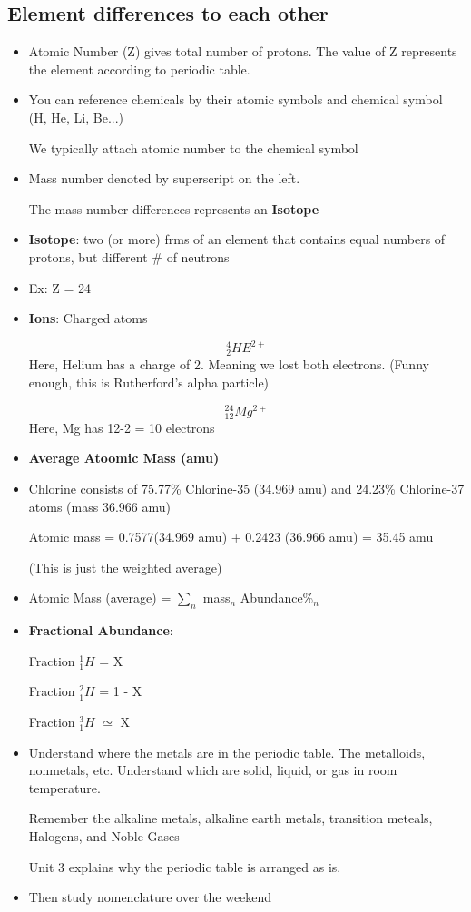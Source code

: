 \documentclass{article}
\begin{document}
\subsection{Element differences to each other}
\begin{itemize}
  \item Atomic Number (Z) gives total number of protons. The value of Z represents the element according to periodic table.
  \item You can reference chemicals by their atomic symbols and chemical symbol (H, He, Li, Be...)

    We typically attach atomic number to the chemical symbol
  \item Mass number denoted by superscript on the left.

    The mass number  differences represents an \textbf{Isotope}
  \item \textbf{Isotope}: two (or more) frms of an element that contains equal numbers of protons,
    but different \# of neutrons
  \item Ex: Z = 24

  \item \textbf{Ions}: Charged atoms

    $${}_{2}^{4}HE^{2+}$$
    Here, Helium has a charge of 2. Meaning we lost both electrons. (Funny enough, this is Rutherford's alpha particle)

    $${}_{12}^{24}Mg^{2+}$$
    Here, Mg has 12-2 = 10 electrons
  \item \textbf{Average Atoomic Mass (amu)}
  \item Chlorine consists of 75.77\% Chlorine-35 (34.969 amu) and 24.23\% Chlorine-37 atoms (mass 36.966 amu)

    Atomic mass = 0.7577(34.969 amu) + 0.2423 (36.966 amu) = 35.45 amu

    (This is just the weighted average)
  \item Atomic Mass (average) = $\sum_{n}$ mass$_{n}$ \times{}  Abundance\%$_{n}$
  \item \textbf{Fractional Abundance}:

    Fraction ${}_{1}^{1}H $ = X

    Fraction ${}_{1}^{2}H $ = 1 - X

    Fraction ${}_{1}^{3}H $ $\simeq{}$ X
  \item Understand where the metals are in the periodic table.
    The metalloids, nonmetals, etc.
    Understand which are solid, liquid, or gas in room temperature.

    Remember the alkaline metals, alkaline earth metals, transition meteals, Halogens, and Noble Gases

    Unit 3 explains why the periodic table is arranged as is.
  \item Then study nomenclature over the weekend


\end{itemize}
\end{document}
